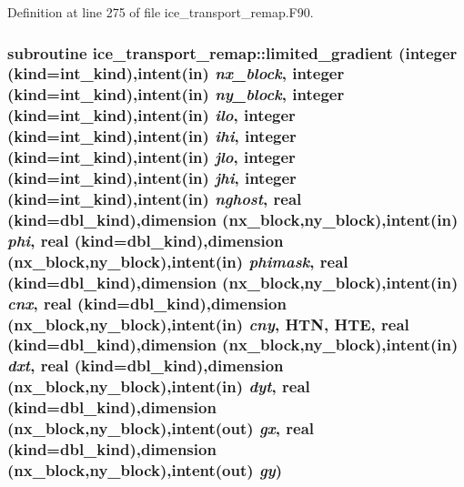 Definition at line 275 of file ice\_\-transport\_\-remap.F90.\hypertarget{namespaceice__transport__remap_ad0f2932484bf98ec16810e79b50b9117}{
\subsubsection[{limited\_\-gradient}]{\setlength{\rightskip}{0pt plus 5cm}subroutine ice\_\-transport\_\-remap::limited\_\-gradient (integer (kind=int\_\-kind),intent(in) {\em nx\_\-block}, \/  integer (kind=int\_\-kind),intent(in) {\em ny\_\-block}, \/  integer (kind=int\_\-kind),intent(in) {\em ilo}, \/  integer (kind=int\_\-kind),intent(in) {\em ihi}, \/  integer (kind=int\_\-kind),intent(in) {\em jlo}, \/  integer (kind=int\_\-kind),intent(in) {\em jhi}, \/  integer (kind=int\_\-kind),intent(in) {\em nghost}, \/  real (kind=dbl\_\-kind),dimension (nx\_\-block,ny\_\-block),intent(in) {\em phi}, \/  real (kind=dbl\_\-kind),dimension (nx\_\-block,ny\_\-block),intent(in) {\em phimask}, \/  real (kind=dbl\_\-kind),dimension (nx\_\-block,ny\_\-block),intent(in) {\em cnx}, \/  real (kind=dbl\_\-kind),dimension (nx\_\-block,ny\_\-block),intent(in) {\em cny}, \/  HTN, \/  HTE, \/  real (kind=dbl\_\-kind),dimension (nx\_\-block,ny\_\-block),intent(in) {\em dxt}, \/  real (kind=dbl\_\-kind),dimension (nx\_\-block,ny\_\-block),intent(in) {\em dyt}, \/  real (kind=dbl\_\-kind),dimension (nx\_\-block,ny\_\-block),intent(out) {\em gx}, \/  real (kind=dbl\_\-kind),dimension (nx\_\-block,ny\_\-block),intent(out) {\em gy})}}
\label{namespaceice__transport__remap_ad0f2932484bf98ec16810e79b50b9117}


